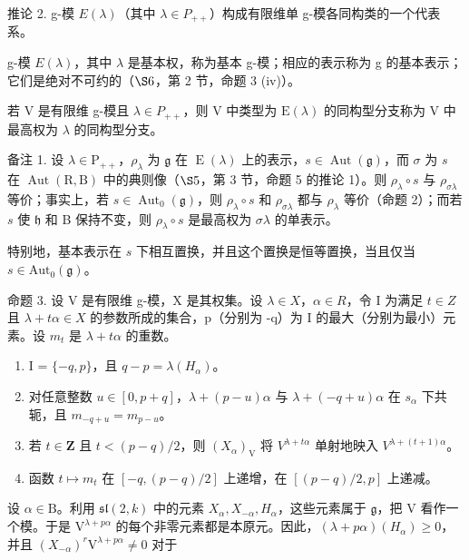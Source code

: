 推论 2. g-模 \(E(\lambda)\)（其中 \(\lambda \in P_{++}\)）构成有限维单 g-模各同构类的一个代表系。

g-模 \(E(\lambda)\)，其中 \(\lambda\) 是基本权，称为基本 g-模；相应的表示称为 g 的基本表示；它们是绝对不可约的（\(\S6\)，第 2 节，命题 3 (iv)）。

若 V 是有限维 g-模且 \(\lambda\in P_{++}\)，则 V 中类型为 \(\mathrm{E}(\lambda)\) 的同构型分支称为 V 中最高权为 \(\lambda\) 的同构型分支。

备注 1. 设 \(\lambda \in \mathrm{P}_{++}\)，\(\rho_{\lambda}\) 为 \(\mathfrak{g}\) 在 \(\operatorname{E}(\lambda)\) 上的表示，\(s \in \operatorname{Aut}(\mathfrak{g})\)，而 \(\sigma\) 为 \(s\) 在 \(\operatorname{Aut}(\mathrm{R},\mathrm{B})\) 中的典则像（\(\S 5\)，第 3 节，命题 5 的推论 1）。则 \(\rho_{\lambda} \circ s\) 与 \(\rho_{\sigma \lambda}\) 等价；事实上，若 \(s \in \operatorname{Aut}_0(\mathfrak{g})\)，则 \(\rho_{\lambda} \circ s\) 和 \(\rho_{\sigma \lambda}\) 都与 \(\rho_{\lambda}\) 等价（命题 2）；而若 \(s\) 使 \(\mathfrak{h}\) 和 B 保持不变，则 \(\rho_{\lambda} \circ s\) 是最高权为 \(\sigma \lambda\) 的单表示。

特别地，基本表示在 \(s\) 下相互置换，并且这个置换是恒等置换，当且仅当 \(s \in \mathrm{Aut}_0(\mathfrak{g})\)。

命题 3. 设 V 是有限维 g-模，X 是其权集。设 \(\lambda \in X\)，\(\alpha \in R\)，令 I 为满足 \(t \in Z\) 且 \(\lambda + t\alpha \in X\) 的参数所成的集合，p（分别为 -q）为 I 的最大（分别为最小）元素。设 \(m_t\) 是 \(\lambda + t\alpha\) 的重数。

\begin{enumerate}
\def\labelenumi{(\roman{enumi})}
\item
  I = \(\{-q, p\}\)，且 \(q - p = \lambda(H_{\alpha})\)。
\item
  对任意整数 \(u \in [0, p + q]\)，\(\lambda + (p - u)\alpha\) 与 \(\lambda + (-q + u)\alpha\) 在 \(s_{\alpha}\) 下共轭，且 \(m_{-q + u} = m_{p - u}\)。
\item
  若 \(t \in \mathbf{Z}\) 且 \(t < (p - q)/2\)，则 \((X_{\alpha})_{\mathrm{V}}\) 将 \(V^{\lambda + t\alpha}\) 单射地映入 \(V^{\lambda + (t + 1)\alpha}\)。
\item
  函数 \(t \mapsto m_t\) 在 \([-q, (p - q)/2]\) 上递增，在 \([(p - q)/2, p]\) 上递减。
\end{enumerate}

设 \(\alpha \in \mathrm{B}\)。利用 \(\mathfrak{sl}(2,k)\) 中的元素 \(X_{\alpha}, X_{-\alpha}, H_{\alpha}\)，这些元素属于 \(\mathfrak{g}\)，把 V 看作一个模。于是 \(\mathrm{V}^{\lambda + p\alpha}\) 的每个非零元素都是本原元。因此，\((\lambda + p\alpha)(H_{\alpha}) \geq 0\)，并且 \((X_{-\alpha})^{r}\mathrm{V}^{\lambda + p\alpha} \neq 0\) 对于

